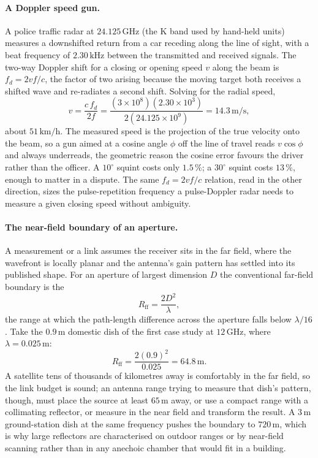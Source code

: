 \paragraph{A Doppler speed gun.}
A police traffic radar at $24.125\,\si{\giga\hertz}$ (the K band used by
hand-held units) measures a downshifted return from a car receding along
the line of sight, with a beat frequency of $2.30\,\si{\kilo\hertz}$
between the transmitted and received signals. The two-way Doppler shift
for a closing or opening speed $v$ along the beam is $f_{d} = 2 v f/c$,
the factor of two arising because the moving target both receives a
shifted wave and re-radiates a second shift. Solving for the radial
speed,
\[
v = \frac{c\, f_{d}}{2 f} = \frac{(3\times 10^{8})(2.30\times 10^{3})}
{2(24.125\times 10^{9})} = 14.3\,\si{\meter\per\second},
\]
about $51\,\si{\kilo\meter\per\hour}$. The measured speed is the
projection of the true velocity onto the beam, so a gun aimed at a
cosine angle $\phi$ off the line of travel reads $v\cos\phi$ and always
underreads, the geometric reason the cosine error favours the driver
rather than the officer. A $10^{\circ}$ squint costs only
$1.5\,\%$; a $30^{\circ}$ squint costs $13\,\%$, enough to matter in a
dispute. The same $f_{d} = 2 v f/c$ relation, read in the other
direction, sizes the pulse-repetition frequency a pulse-Doppler radar
needs to measure a given closing speed without ambiguity.

\paragraph{The near-field boundary of an aperture.}
A measurement or a link assumes the receiver sits in the far field, where
the wavefront is locally planar and the antenna's gain pattern has
settled into its published shape. For an aperture of largest dimension
$D$ the conventional far-field boundary is the 
\[
R_{\mathrm{ff}} = \frac{2 D^{2}}{\lambda},
\]
the range at which the path-length difference across the aperture falls
below $\lambda/16$. Take the $0.9\,\si{\meter}$ domestic dish of the
first case study at $12\,\si{\giga\hertz}$, where $\lambda = 0.025\,\si{
\meter}$:
\[
R_{\mathrm{ff}} = \frac{2(0.9)^{2}}{0.025} = 64.8\,\si{\meter}.
\]
A satellite tens of thousands of kilometres away is comfortably in the
far field, so the link budget is sound; an antenna range trying to
measure that dish's pattern, though, must place the source at least
$65\,\si{\meter}$ away, or use a compact range with a collimating
reflector, or measure in the near field and transform the result. A
$3\,\si{\meter}$ ground-station dish at the same frequency pushes the
boundary to $720\,\si{\meter}$, which is why large reflectors are
characterised on outdoor ranges or by near-field scanning rather than in
any anechoic chamber that would fit in a building.

